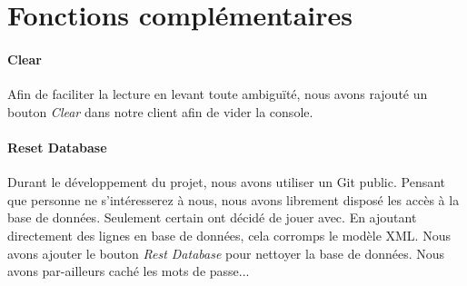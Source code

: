 \documentclass{article}
\begin{document}
  \newpage
  \section{Fonctions complémentaires}
    \paragraph{Clear}
      Afin de faciliter la lecture en levant toute ambiguïté, nous avons rajouté un bouton \emph{Clear} dans
      notre client afin de vider la console.
    \paragraph{Reset Database}
      Durant le développement du projet, nous avons utiliser un Git public. Pensant que personne ne s'intéresserez à nous,
      nous avons librement disposé les accès à la base de données. Seulement certain ont décidé de jouer avec. 
      En ajoutant directement des lignes en base de données, cela corromps le modèle XML. Nous avons ajouter le bouton
      \emph{Rest Database} pour nettoyer la base de données. Nous avons par-ailleurs caché les mots de passe...
\end{document}
